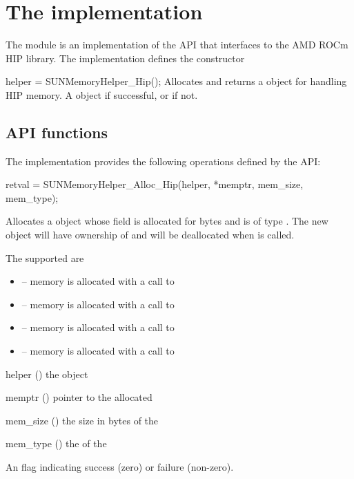 \section{The  implementation}\label{s:sunmemory_hip}

The  module is an implementation of the  API
that interfaces to the AMD ROCm HIP library.  The implementation defines
the constructor

{
  helper = SUNMemoryHelper\_Hip();
}
{
  Allocates and returns a  object for handling HIP memory.
}
{}
{
  A  object if successful, or  if not.
}
{}


%
%
\subsection{ API functions}\label{ss:sunmemhip_functions}

The implementation provides the following operations defined by the  API:

{
  retval = SUNMemoryHelper\_Alloc\_Hip(helper, *memptr, mem\_size, mem\_type);
}
{
  Allocates a  object whose  field is allocated for
   bytes and is of type . The new object will
  have ownership of  and will be deallocated when
   is called.

  The  supported are
  \begin{itemize}
    \item {} -- memory is allocated with a call to 
    \item {} -- memory is allocated with a call to 
    \item {} -- memory is allocated with a call to 
    \item {} -- memory is allocated with a call to 
  \end{itemize}
}
{
  \begin{args}
  \item[helper] () the  object
  \item[memptr] () pointer to the allocated 
  \item[mem\_size] () the size in bytes of the 
  \item[mem\_type] () the  of the 
  \end{args}
}
{
  An  flag indicating success (zero) or failure (non-zero).
}
{}

